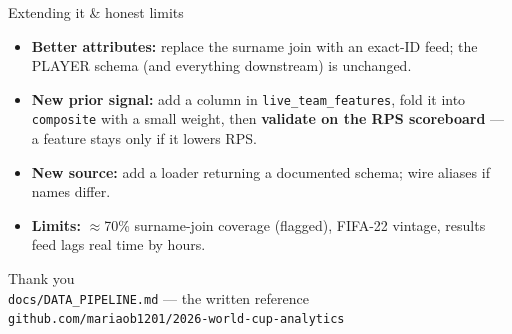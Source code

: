 \documentclass[aspectratio=169]{beamer}
\begin{document}
\begin{frame}{Extending it \& honest limits}
\begin{itemize}
  \item \textbf{Better attributes:} replace the surname join with an exact-ID
        feed; the PLAYER schema (and everything downstream) is unchanged.
  \item \textbf{New prior signal:} add a column in \texttt{live\_team\_features},
        fold it into \texttt{composite} with a small weight, then
        \textbf{validate on the RPS scoreboard} --- a feature stays only if it
        lowers RPS.
  \item \textbf{New source:} add a loader returning a documented schema; wire
        aliases if names differ.
  \item \textbf{Limits:} $\approx$70\% surname-join coverage (flagged), FIFA-22
        vintage, results feed lags real time by hours.
\end{itemize}
\end{frame}

\begin{frame}[plain]
\centering\Large Thank you\\[0.5em]
\normalsize\texttt{docs/DATA\_PIPELINE.md} --- the written reference\\
\texttt{github.com/mariaob1201/2026-world-cup-analytics}
\end{frame}
\end{document}
